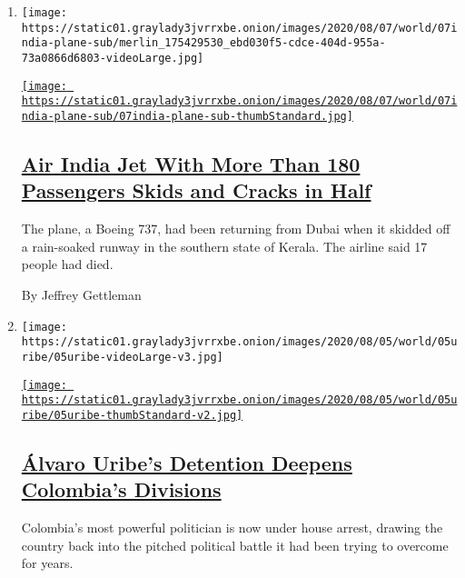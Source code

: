 \begin{enumerate}
\def\labelenumi{\arabic{enumi}.}
\item
  \texttt{[image: https://static01.graylady3jvrrxbe.onion/images/2020/08/07/world/07india-plane-sub/merlin\_175429530\_ebd030f5-cdce-404d-955a-73a0866d6803-videoLarge.jpg]}

  \href{/2020/08/07/world/asia/air-india-plane-crash.html}{\texttt{[image: https://static01.graylady3jvrrxbe.onion/images/2020/08/07/world/07india-plane-sub/07india-plane-sub-thumbStandard.jpg]}}

  \hypertarget{air-india-jet-with-more-than-180-passengers-skids-and-cracks-in-half}{%
  \subsection{\texorpdfstring{\href{/2020/08/07/world/asia/air-india-plane-crash.html}{Air
  India Jet With More Than 180 Passengers Skids and Cracks in
  Half}}{Air India Jet With More Than 180 Passengers Skids and Cracks in Half}}\label{air-india-jet-with-more-than-180-passengers-skids-and-cracks-in-half}}

  The plane, a Boeing 737, had been returning from Dubai when it skidded
  off a rain-soaked runway in the southern state of Kerala. The airline
  said 17 people had died.

  By Jeffrey Gettleman
\item
  \texttt{[image: https://static01.graylady3jvrrxbe.onion/images/2020/08/05/world/05uribe/05uribe-videoLarge-v3.jpg]}

  \href{/2020/08/07/world/americas/uribe-colombia-house-arrest.html}{\texttt{[image: https://static01.graylady3jvrrxbe.onion/images/2020/08/05/world/05uribe/05uribe-thumbStandard-v2.jpg]}}

  \hypertarget{uxe1lvaro-uribes-detention-deepens-colombias-divisions}{%
  \subsection{\texorpdfstring{\href{/2020/08/07/world/americas/uribe-colombia-house-arrest.html}{Álvaro
  Uribe's Detention Deepens Colombia's
  Divisions}}{Álvaro Uribe's Detention Deepens Colombia's Divisions}}\label{uxe1lvaro-uribes-detention-deepens-colombias-divisions}}

  Colombia's most powerful politician is now under house arrest, drawing
  the country back into the pitched political battle it had been trying
  to overcome for years.


\end{enumerate}
